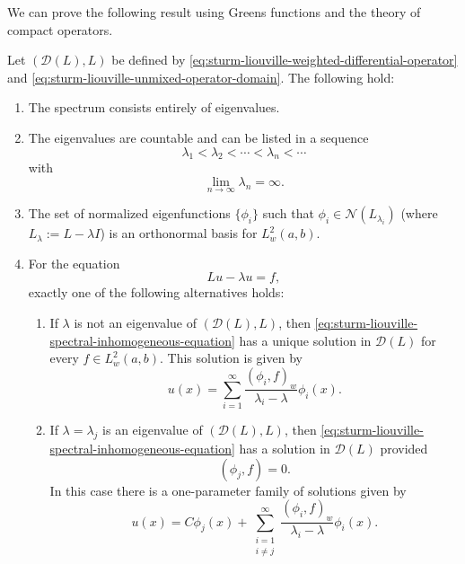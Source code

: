 We can prove the following result using Green\textquotesingle s functions and the theory of compact operators.

\begin{Theorem}
\label{thm:regular-sturm-liouville-complete-spectral}
Let $(\mathcal{D}(L),L)$ be defined by \eqref{eq:sturm-liouville-weighted-differential-operator} and \eqref{eq:sturm-liouville-unmixed-operator-domain}. The following hold:\begin{enumerate}\item The spectrum consists entirely of eigenvalues.\item The eigenvalues are countable and can be listed in a sequence
\begin{equation}\label{eq:sturm-liouville-increasing-eigenvalue-sequence}
\lambda_1<\lambda_2<\cdots<\lambda_n<\cdots
\end{equation}
with
\begin{equation}\label{eq:sturm-liouville-eigenvalues-tend-to-infinity}
\lim_{n\to\infty}\lambda_n=\infty.
\end{equation}
\item The set of normalized eigenfunctions $\{\phi_i\}$ such that $\phi_i\in\mathcal{N}(L_{\lambda_i})$ (where $L_\lambda:=L-\lambda I$) is an orthonormal basis for $L_w^2(a,b)$.\item For the equation
\begin{equation}\label{eq:sturm-liouville-spectral-inhomogeneous-equation}
Lu-\lambda u=f,
\end{equation}
exactly one of the following alternatives holds:\begin{enumerate}[label=(\alph*)]\item If $\lambda$ is not an eigenvalue of $(\mathcal{D}(L),L)$, then \eqref{eq:sturm-liouville-spectral-inhomogeneous-equation} has a unique solution in $\mathcal{D}(L)$ for every $f\in L_w^2(a,b)$. This solution is given by
\begin{equation}\label{eq:sturm-liouville-noneigenvalue-solution-expansion}
u(x)=\sum_{i=1}^\infty\dfrac{(\phi_i,f)_w}{\lambda_i-\lambda}\phi_i(x).
\end{equation}
\item If $\lambda=\lambda_j$ is an eigenvalue of $(\mathcal{D}(L),L)$, then \eqref{eq:sturm-liouville-spectral-inhomogeneous-equation} has a solution in $\mathcal{D}(L)$ provided
\begin{equation}\label{eq:sturm-liouville-eigenvalue-solvability-condition}
(\phi_j,f)=0.
\end{equation}
In this case there is a one-parameter family of solutions given by
\begin{equation}\label{eq:sturm-liouville-eigenvalue-solution-family}
u(x)=C\phi_j(x)+\sum_{\substack{i=1\\i\ne j}}^\infty\dfrac{(\phi_i,f)_w}{\lambda_i-\lambda}\phi_i(x).
\end{equation}
\end{enumerate}\end{enumerate}
\end{Theorem}

